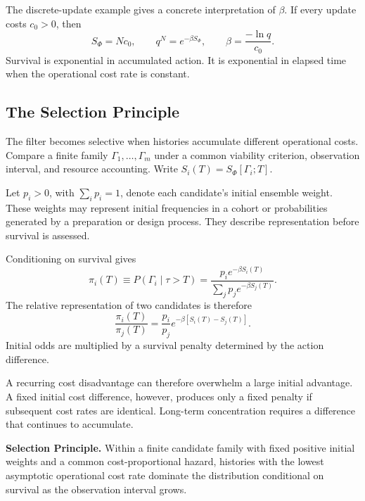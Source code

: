 The discrete-update example gives a concrete interpretation of
$\beta$. If every update costs $c_0>0$, then
\begin{equation}
\label{eq:discrete_survival}
    S_\Phi=Nc_0,
    \qquad
    q^N=e^{-\beta S_\Phi},
    \qquad
    \beta=\frac{-\ln q}{c_0}.
\end{equation}
Survival is exponential in accumulated action. It is exponential
in elapsed time when the operational cost rate is constant.

\subsection{The Selection Principle}
\label{subsec:severity}

The filter becomes selective when histories accumulate different
operational costs. Compare a finite family
$\Gamma_1,\ldots,\Gamma_m$ under a common viability criterion,
observation interval, and resource accounting. Write
$S_i(T)=S_\Phi[\Gamma_i;T]$.

Let $p_i>0$, with $\sum_i p_i=1$, denote each candidate's initial
ensemble weight. These weights may represent initial frequencies
in a cohort or probabilities generated by a preparation or design
process. They describe representation before survival is assessed.

Conditioning on survival gives
\begin{equation}
\label{eq:survivor_distribution}
    \pi_i(T)
    \equiv P(\Gamma_i\mid\tau>T)
    =
    \frac{p_i e^{-\beta S_i(T)}}
         {\sum_j p_j e^{-\beta S_j(T)}}.
\end{equation}
The relative representation of two candidates is therefore
\begin{equation}
\label{eq:severity}
    \frac{\pi_i(T)}{\pi_j(T)}
    =
    \frac{p_i}{p_j}
    e^{-\beta[S_i(T)-S_j(T)]}.
\end{equation}
Initial odds are multiplied by a survival penalty determined
by the action difference.

A recurring cost disadvantage can therefore overwhelm a large
initial advantage. A fixed initial cost difference, however,
produces only a fixed penalty if subsequent cost rates are
identical. Long-term concentration requires a difference that
continues to accumulate.

\begin{mdframed}[
    linewidth=1pt,
    linecolor=black,
    backgroundcolor=gray!10
]
\noindent\textbf{Selection Principle.}
Within a finite candidate family with fixed positive initial
weights and a common cost-proportional hazard, histories with
the lowest asymptotic operational cost rate dominate the
distribution conditional on survival as the observation
interval grows.
\end{mdframed}

